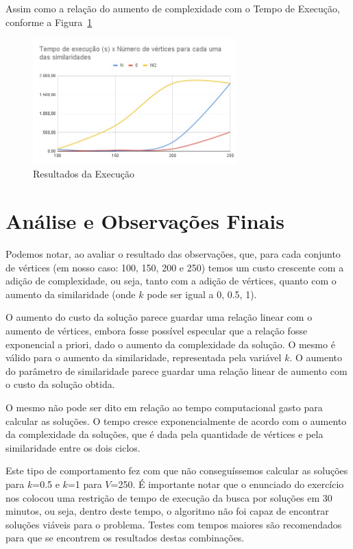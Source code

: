 \documentclass{article}
\begin{document}
Assim como a relação do aumento de complexidade com o Tempo de Execução, conforme a Figura~\ref{f:g-tempo}
\begin{figure}
    \centering
    \includegraphics[width=0.7\textwidth]{figures/sol-tempo.jpeg}
    \caption{Resultados da Execução}
    \label{f:g-tempo}
\end{figure}

\section{Análise e Observações Finais}

Podemos notar, ao avaliar o resultado das observações, que, para cada conjunto de vértices (em nosso caso: 100, 150, 200 e 250) temos um custo crescente com a adição de complexidade, ou seja, tanto com a adição de vértices, quanto com o aumento da similaridade (onde $k$ pode ser igual a {0, 0.5, 1}).

O aumento do custo da solução parece guardar uma relação linear com o aumento de vértices, embora fosse possível especular que a relação fosse exponencial a priori, dado o aumento da complexidade da solução. O mesmo é válido para o aumento da similaridade, representada pela variável $k$. O aumento do parâmetro de similaridade parece guardar uma relação linear de aumento com o custo da solução obtida.

O mesmo não pode ser dito em relação ao tempo computacional gasto para calcular as soluções. O tempo cresce exponencialmente de acordo com o aumento da complexidade da soluções, que é dada pela quantidade de vértices e pela similaridade entre os dois ciclos.

Este tipo de comportamento fez com que não conseguíssemos calcular as soluções para $k$=0.5 e $k$=1 para $V$=250. É importante notar que o enunciado do exercício nos colocou uma restrição de tempo de execução da busca por soluções em 30 minutos, ou seja, dentro deste tempo, o algoritmo não foi capaz de encontrar soluções viáveis para o problema. Testes com tempos maiores são recomendados para que se encontrem os resultados destas combinações.




\end{document}
